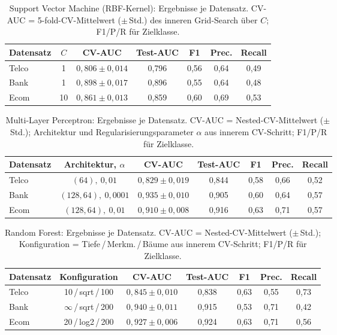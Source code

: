 \documentclass[10pt]{scrartcl}
\begin{document}
\begin{table}[H]
\centering
\footnotesize
\setlength{\tabcolsep}{4pt}
\caption{Support Vector Machine (RBF-Kernel): Ergebnisse je Datensatz. CV-AUC = 5-fold-CV-Mittelwert ($\pm$\,Std.) des inneren Grid-Search über $C$; F1/P/R für Zielklasse.}\label{tab:svm-results}
\begin{tabular}{lcccccc}
\toprule
Datensatz & $C$ & CV-AUC & Test-AUC & F1 & Prec. & Recall \\
\midrule
Telco & 1  & $0{,}806 \pm 0{,}014$ & 0{,}796 & 0{,}56 & 0{,}64 & 0{,}49 \\
Bank  & 1  & $0{,}898 \pm 0{,}017$ & 0{,}896 & 0{,}55 & 0{,}64 & 0{,}48 \\
Ecom  & 10 & $0{,}861 \pm 0{,}013$ & 0{,}859 & 0{,}60 & 0{,}69 & 0{,}53 \\
\bottomrule
\end{tabular}
\end{table}

\begin{table}[H]
\centering
\footnotesize
\setlength{\tabcolsep}{4pt}
\caption{Multi-Layer Perceptron: Ergebnisse je Datensatz. CV-AUC = Nested-CV-Mittelwert ($\pm$\,Std.); Architektur und Regularisierungsparameter $\alpha$ aus innerem CV-Schritt; F1/P/R für Zielklasse.}\label{tab:mlp-results}
\begin{tabular}{lcccccc}
\toprule
Datensatz & Architektur, $\alpha$ & CV-AUC & Test-AUC & F1 & Prec. & Recall \\
\midrule
Telco & $(64),\ 0{,}01$     & $0{,}829 \pm 0{,}019$ & 0{,}844 & 0{,}58 & 0{,}66 & 0{,}52 \\
Bank  & $(128,64),\ 0{,}0001$ & $0{,}935 \pm 0{,}010$ & 0{,}905 & 0{,}60 & 0{,}64 & 0{,}57 \\
Ecom  & $(128,64),\ 0{,}01$ & $0{,}910 \pm 0{,}008$ & 0{,}916 & 0{,}63 & 0{,}71 & 0{,}57 \\
\bottomrule
\end{tabular}
\end{table}

\begin{table}[H]
\centering
\footnotesize
\setlength{\tabcolsep}{4pt}
\caption{Random Forest: Ergebnisse je Datensatz. CV-AUC = Nested-CV-Mittelwert ($\pm$\,Std.); Konfiguration = Tiefe\,/\,Merkm.\,/\,Bäume aus innerem CV-Schritt; F1/P/R für Zielklasse.}\label{tab:rf-results}
\begin{tabular}{lcccccc}
\toprule
Datensatz & Konfiguration & CV-AUC & Test-AUC & F1 & Prec. & Recall \\
\midrule
Telco & 10\,/\,sqrt\,/\,100    & $0{,}845 \pm 0{,}010$ & 0{,}838 & 0{,}63 & 0{,}55 & 0{,}73 \\
Bank  & $\infty$\,/\,sqrt\,/\,200 & $0{,}940 \pm 0{,}011$ & 0{,}915 & 0{,}53 & 0{,}71 & 0{,}42 \\
Ecom  & 20\,/\,log2\,/\,200    & $0{,}927 \pm 0{,}006$ & 0{,}924 & 0{,}63 & 0{,}71 & 0{,}56 \\
\bottomrule
\end{tabular}
\end{table}
\end{document}
